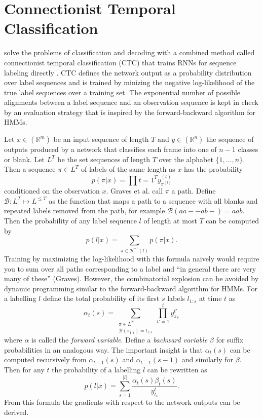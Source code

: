 \section{Connectionist Temporal Classification}
\label{sec:ctc}

\citeauthor{ctc} solve the problems of classification and decoding with a
combined method called connectionist temporal classification (CTC) that trains
RNNs for sequence labeling directly \cite{ctc}. CTC defines the network output
as a probability distribution over label sequences and is trained by minizing
the negative log-likelihood of the true label sequences over a training set. The
exponential number of possible alignments between a label sequence and an
observation sequence is kept in check by an evaluation strategy that is inspired
by the forward-backward algorithm for HMMs.

Let $x \in (\mathbb{R}^{m})$ be an input sequence of length $T$ and $y \in
(\mathbb{R}^{n})$ the sequence of outputs produced by a network that classifies
each frame into one of $n - 1$ classes or blank. Let $L^{T}$ be the set
sequences of length $T$ over the alphabet $\{ 1, \dots, n \}$. Then a sequence
$\pi \in L^{T}$ of labels of the same length as $x$ has the probability
\begin{equation*}
  p(\pi | x) = \prod{t = 1}^{T} y^{(t)}_{\pi^{(t)}}
\end{equation*}
conditioned on the observation $x$. Graves et al. call $\pi$ a path. Define
$\mathcal{B} : L^{T} \mapsto L^{\le T}$ as the function that maps a path to a
sequence with all blanks and repeated labels removed from the path, for example
$\mathcal{B}(aa--ab-) = aab$. Then the probability of any label sequence $l$ of
length at most $T$ can be computed by
\begin{equation*}
  p(l | x) = \sum_{\pi \in \mathcal{B}^{-1}(l)} p(\pi | x).
\end{equation*}
Training by maximizing the log-likelihood with this formula naively would
require you to sum over all paths corresponding to a label and ``in general
there are very many of these'' (Graves). However, the combinatorial explosion
can be avoided by dynamic programming similar to the forward-backward algorithm
for HMMs. For a labelling $l$ define the total probability of its first $s$
labels $l_{1:s}$ at time $t$ as
\begin{equation*}
  \alpha_{t}(s) = \sum_{\substack{\pi \in L^{T}\\\mathcal{B}(\pi_{1:t}) = l_{1:s}}} \prod_{t' = 1}^{t} y^{t'}_{\pi_{t'}}
\end{equation*}
where $\alpha$ is called the \emph{forward variable}. Define a \emph{backward
  variable} $\beta$ for suffix probabilities in an analogous way. The important
insight is that $\alpha_{t}(s)$ can be computed recursively from $\alpha_{t -
  1}(s)$ and $\alpha_{t - 1}(s - 1)$ and similarly for $\beta$. Then for any $t$
the probability of a labelling $l$ can be rewritten as
\begin{equation*}
  p(l | x) = \sum_{s = 1}^{|l|} \frac{\alpha_{t}(s) \beta_{t}(s)}{y^{t}_{l_{s}}}.
\end{equation*}
From this formula the gradients with respect to the network outputs can be
derived.

